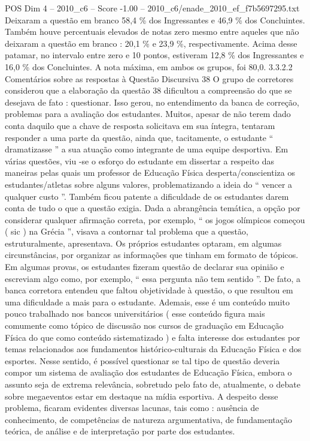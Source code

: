 \begin{textsample}{POS Dim 4 – 2010\_c6 – Score -1.00 – 2010\_c6/enade\_2010\_ef\_f7b5697295.txt}
Deixaram a questão em branco 58,4 \% dos Ingressantes e 46,9 \% dos Concluintes.
Também houve percentuais elevados de notas zero mesmo entre aqueles que não deixaram a questão em branco : 20,1 \% e 23,9 \%, respectivamente.
Acima desse patamar, no intervalo entre zero e 10 pontos, estiveram 12,8 \% dos Ingressantes e 16,0 \% dos Concluintes.
A nota máxima, em ambos os grupos, foi 80,0. 3.3.2.2 Comentários sobre as respostas à Questão Discursiva 38 O grupo de corretores considerou que a elaboração da questão 38 dificultou a compreensão do que se desejava de fato : questionar.
Isso gerou, no entendimento da banca de correção, problemas para a avaliação dos estudantes.
Muitos, apesar de não terem dado conta daquilo que a chave de resposta solicitava em sua íntegra, tentaram responder a uma parte da questão, ainda que, tacitamente, o estudante “ dramatizasse ” a sua atuação como integrante de uma equipe desportiva.
Em várias questões, viu -se o esforço do estudante em dissertar a respeito das maneiras pelas quais um professor de Educação Física desperta/conscientiza os estudantes/atletas sobre alguns valores, problematizando a ideia do “ vencer a qualquer custo ”.
Também ficou patente a dificuldade de os estudantes darem conta de tudo o que a questão exigia.
Dada a abrangência temática, a opção por considerar qualquer afirmação correta, por exemplo, “ os jogos olímpicos começou ( sic ) na Grécia ”, visava a contornar tal problema que a questão, estruturalmente, apresentava.
Os próprios estudantes optaram, em algumas circunstâncias, por organizar as informações que tinham em formato de tópicos.
Em algumas provas, os estudantes fizeram questão de declarar sua opinião e escreviam algo como, por exemplo, “ essa pergunta não tem sentido ”.
De fato, a banca corretora entendeu que faltou objetividade à questão, o que resultou em uma dificuldade a mais para o estudante.
Ademais, esse é um conteúdo muito pouco trabalhado nos bancos universitários ( esse conteúdo figura mais comumente como tópico de discussão nos cursos de graduação em Educação Física do que como conteúdo sistematizado ) e falta interesse dos estudantes por temas relacionados aos fundamentos histórico-culturais da Educação Física e dos esportes.
Nesse sentido, é possível questionar se tal tipo de questão deveria compor um sistema de avaliação dos estudantes de Educação Física, embora o assunto seja de extrema relevância, sobretudo pelo fato de, atualmente, o debate sobre megaeventos estar em destaque na mídia esportiva.
A despeito desse problema, ficaram evidentes diversas lacunas, tais como : ausência de conhecimento, de competências de natureza argumentativa, de fundamentação teórica, de análise e de interpretação por parte dos estudantes.

\end{textsample}
